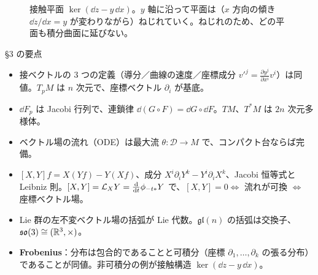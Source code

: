 \begin{figure}[htbp]
\centering
{}
\caption{接触平面 $\ker(\dd z-y\,\dd x)$。$y$ 軸に沿って平面は（$x$ 方向の傾き $\dd z/\dd x=y$ が変わりながら）ねじれていく。ねじれのため、どの平面も積分曲面に延びない。}\label{A:fig:contact}
\end{figure}

\begin{keybox}{§3 の要点}
\begin{itemize}
\item 接ベクトルの 3 つの定義（導分／曲線の速度／座標成分 $v'^j=\frac{\partial y^j}{\partial x^i}v^i$）は同値。$T_pM$ は $n$ 次元で、座標ベクトル $\partial_i$ が基底。
\item $\dd F_p$ は Jacobi 行列で、連鎖律 $\dd(G\circ F)=\dd G\circ\dd F$。$TM$、$T^*M$ は $2n$ 次元多様体。
\item ベクトル場の流れ（ODE）は最大流 $\theta:\mathcal D\to M$ で、コンパクト台ならば完備。
\item \mbox{$[X,Y]f=X(Yf)-Y(Xf)$}、成分 \mbox{$X^i\partial_iY^k-Y^i\partial_iX^k$}、Jacobi 恒等式と Leibniz 則。$[X,Y]=\mathcal L_XY=\frac{\mathrm{d}}{\mathrm{d} t}\phi_{-t*}Y$ で、$[X,Y]=0\Leftrightarrow$ 流れが可換 $\Leftrightarrow$ 座標ベクトル場。
\item Lie 群の左不変ベクトル場の括弧が Lie 代数。$\mathfrak{gl}(n)$ の括弧は交換子、\allowbreak\mbox{$\mathfrak{so}(3)\cong(\mathbb R^3,\times)$}。
\item \textbf{Frobenius}：分布は包合的であることと可積分（座標 $\partial_1,\dots,\partial_k$ の張る分布）であることが同値。非可積分の例が接触構造 $\ker(\dd z-y\,\dd x)$。
\end{itemize}
\end{keybox}

